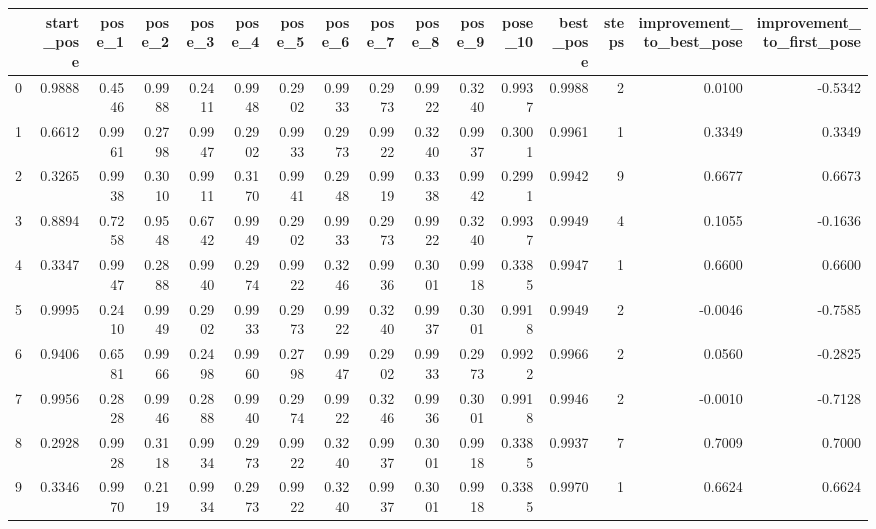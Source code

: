 \begin{tabular}{lrrrrrrrrrrrrrrr}
\toprule
{} &  start\_pose &  pose\_1 &  pose\_2 &  pose\_3 &  pose\_4 &  pose\_5 &  pose\_6 &  pose\_7 &  pose\_8 &  pose\_9 &  pose\_10 &  best\_pose &  steps &  improvement\_to\_best\_pose &  improvement\_to\_first\_pose \\
\midrule
0 &      0.9888 &  0.4546 &  0.9988 &  0.2411 &  0.9948 &  0.2902 &  0.9933 &  0.2973 &  0.9922 &  0.3240 &   0.9937 &     0.9988 &      2 &                    0.0100 &                    -0.5342 \\
1 &      0.6612 &  0.9961 &  0.2798 &  0.9947 &  0.2902 &  0.9933 &  0.2973 &  0.9922 &  0.3240 &  0.9937 &   0.3001 &     0.9961 &      1 &                    0.3349 &                     0.3349 \\
2 &      0.3265 &  0.9938 &  0.3010 &  0.9911 &  0.3170 &  0.9941 &  0.2948 &  0.9919 &  0.3338 &  0.9942 &   0.2991 &     0.9942 &      9 &                    0.6677 &                     0.6673 \\
3 &      0.8894 &  0.7258 &  0.9548 &  0.6742 &  0.9949 &  0.2902 &  0.9933 &  0.2973 &  0.9922 &  0.3240 &   0.9937 &     0.9949 &      4 &                    0.1055 &                    -0.1636 \\
4 &      0.3347 &  0.9947 &  0.2888 &  0.9940 &  0.2974 &  0.9922 &  0.3246 &  0.9936 &  0.3001 &  0.9918 &   0.3385 &     0.9947 &      1 &                    0.6600 &                     0.6600 \\
5 &      0.9995 &  0.2410 &  0.9949 &  0.2902 &  0.9933 &  0.2973 &  0.9922 &  0.3240 &  0.9937 &  0.3001 &   0.9918 &     0.9949 &      2 &                   -0.0046 &                    -0.7585 \\
6 &      0.9406 &  0.6581 &  0.9966 &  0.2498 &  0.9960 &  0.2798 &  0.9947 &  0.2902 &  0.9933 &  0.2973 &   0.9922 &     0.9966 &      2 &                    0.0560 &                    -0.2825 \\
7 &      0.9956 &  0.2828 &  0.9946 &  0.2888 &  0.9940 &  0.2974 &  0.9922 &  0.3246 &  0.9936 &  0.3001 &   0.9918 &     0.9946 &      2 &                   -0.0010 &                    -0.7128 \\
8 &      0.2928 &  0.9928 &  0.3118 &  0.9934 &  0.2973 &  0.9922 &  0.3240 &  0.9937 &  0.3001 &  0.9918 &   0.3385 &     0.9937 &      7 &                    0.7009 &                     0.7000 \\
9 &      0.3346 &  0.9970 &  0.2119 &  0.9934 &  0.2973 &  0.9922 &  0.3240 &  0.9937 &  0.3001 &  0.9918 &   0.3385 &     0.9970 &      1 &                    0.6624 &                     0.6624 \\
\bottomrule
\end{tabular}
